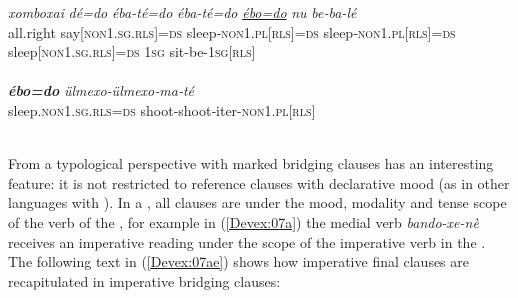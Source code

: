 \documentclass[output=paper]{LSP/langsci}
\begin{document}
\begin{exe}
\ex \label{Devex:06ab}
\begin{xlist}
\ex \label{Devex:06a}			
\gll \textit{xomboxai} \textit{dé=do} \textit{éba-té=do} \textit{éba-té=do} \textit{\underline{ébo=do}} \textit{nu} \textit{be‑ba‑lé}\\     all.right say[\textsc{non1.sg.rls}]=\textsc{ds} sleep‑\textsc{non1.pl[rls]=ds}  		sleep‑\textsc{non1.pl[rls]=ds} sleep[\textsc{non1.sg.rls}]=\textsc{ds} \textsc{1sg} sit-be-\textsc{1sg[rls]}\\ 
\glt {}\\ 
\ex \label{Devex:06b}			
\gll \textbf{\textit{ébo=do}} \textit{ülmexo‑ülmexo‑ma‑té}\\
sleep.\textsc{non1.sg.rls=ds} shoot‑shoot‑iter-\textsc{non1.pl[rls]}\\ 
\glt {}\\
\end{xlist}
\end{exe}

From a typological perspective   with  marked bridging clauses has an interesting feature: it is not restricted to reference clauses with declarative mood (as in other languages with ). In a , all clauses are under the mood, modality and tense scope of the verb of the , for example in (\ref{Devex:07a}) the medial verb \textit{bando-xe-nè} receives an imperative reading under the scope of the imperative verb in the . The following text in (\ref{Devex:07ae}) shows how imperative final clauses are recapitulated in imperative bridging clauses:
\end{document}
